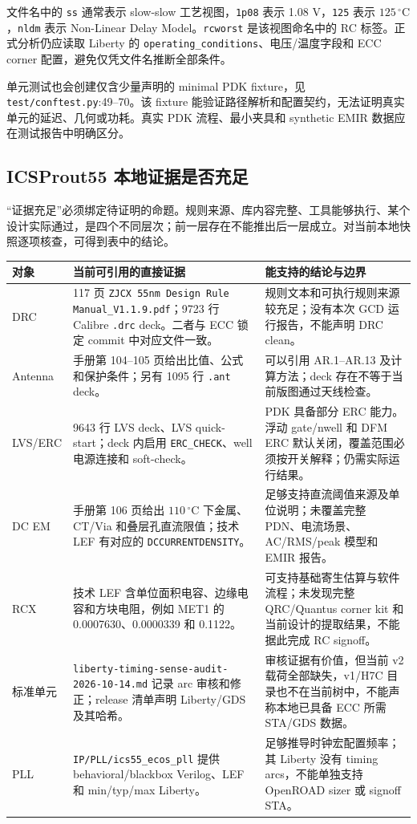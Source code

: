 \documentclass[UTF8,a4paper,11pt,fontset=fandol]{ctexart}
\numberwithin{equation}{section}
\newcommand{\code}[1]{\nolinkurl{#1}}
\begin{document}
文件名中的 \code{ss} 通常表示 slow-slow 工艺视图，\code{1p08} 表示 1.08 V，\code{125} 表示 $125\,^{\circ}\mathrm{C}$，\code{nldm} 表示 Non-Linear Delay Model。\code{rcworst} 是该视图命名中的 RC 标签。正式分析仍应读取 Liberty 的 \code{operating_conditions}、电压/温度字段和 ECC corner 配置，避免仅凭文件名推断全部条件。

单元测试也会创建仅含少量声明的 minimal PDK fixture，见 \code{test/conftest.py}:49--70。该 fixture 能验证路径解析和配置契约，无法证明真实单元的延迟、几何或功耗。真实 PDK 流程、最小夹具和 synthetic EMIR 数据应在测试报告中明确区分。

\subsection{ICSProut55 本地证据是否充足}

“证据充足”必须绑定待证明的命题。规则来源、库内容完整、工具能够执行、某个设计实际通过，是四个不同层次；前一层存在不能推出后一层成立。对当前本地快照逐项核查，可得到表中的结论。

\begin{center}
\small
\begin{tabularx}{\textwidth}{p{}p{}X}
\toprule
对象 & 当前可引用的直接证据 & 能支持的结论与边界 \\
\midrule
DRC & 117 页 \code{ZJCX 55nm Design Rule Manual_V1.1.9.pdf}；9723 行 Calibre \code{.drc} deck。二者与 ECC 锁定 commit 中对应文件一致。 & 规则文本和可执行规则来源较充足；没有本次 GCD 运行报告，不能声明 DRC clean。 \\
Antenna & 手册第 104--105 页给出比值、公式和保护条件；另有 1095 行 \code{.ant} deck。 & 可以引用 AR.1--AR.13 及计算方法；deck 存在不等于当前版图通过天线检查。 \\
LVS/ERC & 9643 行 LVS deck、LVS quick-start；deck 内启用 \code{ERC_CHECK}、well 电源连接和 soft-check。 & PDK 具备部分 ERC 能力。浮动 gate/nwell 和 DFM ERC 默认关闭，覆盖范围必须按开关解释；仍需实际运行结果。 \\
DC EM & 手册第 106 页给出 $110\,^{\circ}\mathrm{C}$ 下金属、CT/Via 和叠层孔直流限值；技术 LEF 有对应的 \code{DCCURRENTDENSITY}。 & 足够支持直流阈值来源及单位说明；未覆盖完整 PDN、电流场景、AC/RMS/peak 模型和 EMIR 报告。 \\
RCX & 技术 LEF 含单位面积电容、边缘电容和方块电阻，例如 MET1 的 0.0007630、0.0000339 和 0.1122。 & 可支持基础寄生估算与软件流程；未发现完整 QRC/Quantus corner kit 和当前设计的提取结果，不能据此完成 RC signoff。 \\
标准单元 & \code{liberty-timing-sense-audit-2026-10-14.md} 记录 arc 审核和修正；release 清单声明 Liberty/GDS 及其哈希。 & 审核证据有价值，但当前 v2 载荷全部缺失，v1/H7C 目录也不在当前树中，不能声称本地已具备 ECC 所需 STA/GDS 数据。 \\
PLL & \code{IP/PLL/ics55_ecos_pll} 提供 behavioral/blackbox Verilog、LEF 和 min/typ/max Liberty。 & 足够推导时钟宏配置频率；其 Liberty 没有 timing arcs，不能单独支持 OpenROAD sizer 或 signoff STA。 \\
\bottomrule
\end{tabularx}
\end{center}
\end{document}
